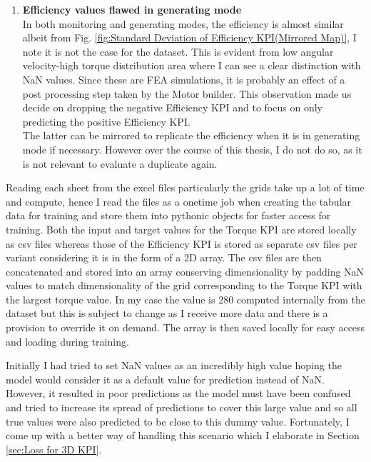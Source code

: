 \documentclass{report} %
\begin{document}
\begin{enumerate}[nosep]
    \item \textbf{Efficiency values flawed in generating mode}\\
    In both monitoring and generating modes, the efficiency is almost similar albeit from Fig. \ref{fig:Standard Deviation of Efficiency KPI(Mirrored Map)}, 
    I note it is not the case for the dataset. This is evident from low angular velocity-high torque distribution area where I can see a clear distinction with \ac{NaN} values.
    Since these are \ac{FEA} simulations, it is probably an effect of a post processing step taken by the Motor builder.
    This observation made us decide on dropping the negative Efficiency \ac{KPI} and to focus on only predicting the positive Efficiency \ac{KPI}.\\
    The latter can be mirrored to replicate the efficiency when it is in generating mode if necessary.
    However over the course of this thesis, I do not do so, as it is not relevant to evaluate a duplicate again.\\
\end{enumerate}


Reading each sheet from the excel files particularly the grids take up a lot of time and compute, hence I read the files as a onetime job when creating the 
tabular data for training  and store them into pythonic objects for faster access for training.
Both the input and target values for the Torque \ac{KPI} are stored locally as csv files whereas those of the Efficiency \ac{KPI} is stored as separate csv files per 
variant considering it is in the form of a 2\ac{D} array.
The csv files are then concatenated and stored into an array conserving dimensionality by padding \ac{NaN} values to match dimensionality of the grid 
corresponding to the Torque \ac{KPI} with the largest torque value.
In my case the value is 280 computed internally from the dataset but this is subject to change as I receive more data and there is a provision to override it 
on demand. The array is then saved locally for easy access and loading during training.

Initially I had tried to set \ac{NaN} values as an incredibly high value hoping the model would consider it as a default value for prediction instead of \ac{NaN}.
However, it resulted in poor predictions as the model must have been confused and tried to increase its spread of predictions to cover this large value and so all 
true values were also predicted to be close to this dummy value.
Fortunately, I come up with a better way of handling this scenario which I elaborate in Section \ref{sec:Loss for 3D KPI}.
\end{document}
